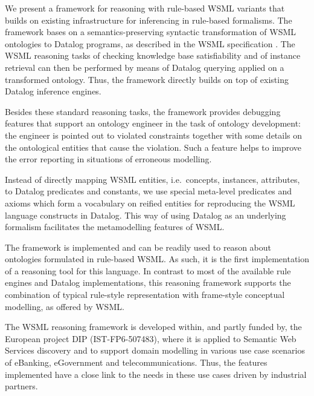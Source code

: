 \smallskip

We present a framework for reasoning with rule-based WSML variants
that builds on existing infrastructure for inferencing in
rule-based formalisms. The framework bases on a
semantics-preserving syntactic transformation of WSML ontologies
to Datalog programs, as described in the WSML specification
\cite{wsml-spec}. The WSML reasoning tasks of checking knowledge
base satisfiability and of instance retrieval can then be
performed by means of Datalog querying applied on a transformed
ontology. Thus, the framework directly builds on top of existing
Datalog inference engines.

Besides these standard reasoning tasks, the framework provides
debugging features that support an ontology engineer in the task
of ontology development: the engineer is pointed out to violated
constraints together with some details on the ontological entities
that cause the violation. Such a feature helps to improve the
error reporting in situations of erroneous modelling.

Instead of directly mapping WSML entities, i.e.\ concepts,
instances, attributes, to Datalog predicates and constants, we use
special meta-level predicates and axioms which form a vocabulary
on reified entities for reproducing the WSML language constructs
in Datalog. This way of using Datalog as an underlying formalism
facilitates the metamodelling features of WSML.

\smallskip

The framework is implemented and can be readily used to reason
about ontologies formulated in rule-based WSML. As such, it is the
first implementation of a reasoning tool for this language. In
contrast to most of the available rule engines and Datalog
implementations, this reasoning framework supports the combination
of typical rule-style representation with frame-style conceptual
modelling, as offered by WSML.

The WSML reasoning framework is developed within, and partly
funded by, the European project DIP (IST-FP6-507483), where it is
applied to Semantic Web Services discovery and to support domain
modelling in various use case scenarios of eBanking, eGovernment
and telecommunications. Thus, the features implemented have a
close link to the needs in these use cases driven by industrial
partners.
